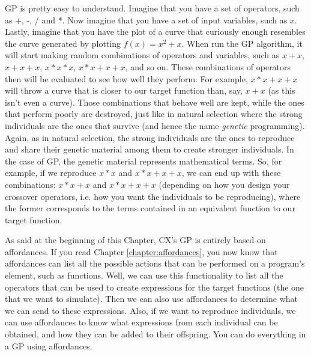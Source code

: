 \documentclass[11pt,fleqn,openany]{book} %
\begin{document}
GP is pretty easy to understand. Imagine that you have a set of operators, such as +, -, / and *. Now imagine that you have a set of input variables, such as $x$. Lastly, imagine that you have the plot of a curve that curiously enough resembles the curve generated by plotting $f(x) = x^2 + x$. When run the GP algorithm, it will start making random combinations of operators and variables, such as $x+x$, $x+x+x$, $x*x*x$, $x*x + x + x$, and so on. These combinations of operators then will be evaluated to see how well they perform. For example, $x * x + x + x$ will throw a curve that is closer to our target function than, say, $x + x$ (as this isn't even a curve). Those combinations that behave well are kept, while the ones that perform poorly are destroyed, just like in natural selection where the strong individuals are the ones that survive (and hence the name \emph{genetic} programming). Again, as in natural selection, the strong individuals are the ones to reproduce and share their genetic material among them to create stronger individuals. In the case of GP, the genetic material represents mathematical terms. So, for example, if we reproduce $x * x$ and $x * x + x + x$, we can end up with these combinations: $x * x + x$ and $x * x + x + x$ (depending on how you design your crossover operators, i.e. how you want the individuals to be reproducing), where the former corresponds to the terms contained in an equivalent function to our target function.

As said at the beginning of this Chapter, CX's GP is entirely based on affordances. If you read Chapter \ref{chapter:affordances}, you now know that affordances can list all the possible actions that can be performed on a program's element, such as functions. Well, we can use this functionality to list all the operators that can be used to create expressions for the target functions (the one that we want to simulate). Then we can also use affordances to determine what we can send to these expressions. Also, if we want to reproduce individuals, we can use affordances to know what expressions from each individual can be obtained, and how they can be added to their offspring. You can do everything in a GP using affordances.
\end{document}
